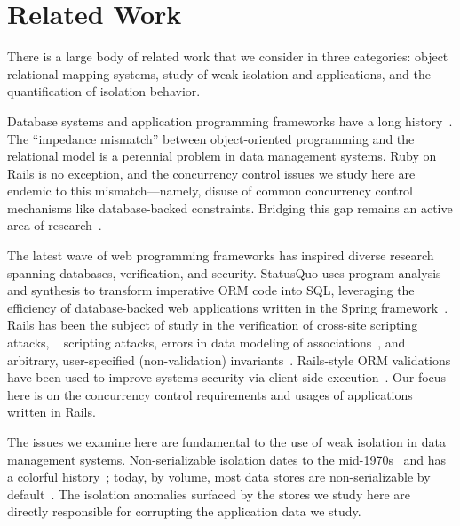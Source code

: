 
\section{Related Work}
\label{sec:relatedwork}

There is a large body of related work that we consider in
three categories: object relational mapping systems, study of weak
isolation and applications, and the quantification of isolation behavior.

 Database systems and application programming
frameworks have a long
history~\cite{objectstore,shore,bernstein-orm}. The ``impedance
mismatch'' between object-oriented programming and the relational
model is a perennial problem in data management systems. Ruby on Rails
is no exception, and the concurrency control issues we study here are
endemic to this mismatch---namely, disuse of common concurrency
control mechanisms like database-backed constraints. Bridging this gap
remains an active area of research~\cite{db-to-model}.

The latest wave of web programming frameworks has inspired diverse
research spanning databases, verification, and security. StatusQuo
uses program analysis and synthesis to transform imperative ORM code
into SQL, leveraging the efficiency of database-backed web
applications written in the Spring framework~\cite{statusquo}. Rails
has been the subject of study in the verification of cross-site
scripting attacks, ~\cite{rails-xss} scripting attacks, errors in data
modeling of associations~\cite{rails-bounded}, and arbitrary,
user-specified (non-validation) invariants~\cite{invariant-web}.
Rails-style ORM validations have been used to improve systems security
via client-side execution~\cite{waves,caveat}. Our focus here is on
the concurrency control requirements and usages of applications
written in Rails.

 The issues we examine here
are fundamental to the use of weak isolation in data management
systems. Non-serializable isolation dates to the
mid-1970s~\cite{gray-isolation} and has a colorful
history~\cite{adya-isolation}; today, by volume, most data stores are
non-serializable by default~\cite{hat-vldb}. The isolation anomalies
surfaced by the stores we study here are directly responsible for
corrupting the application data we study.


